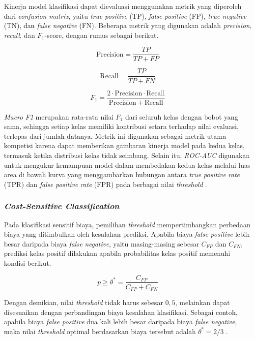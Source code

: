 Kinerja model klasifikasi dapat dievaluasi menggunakan metrik yang diperoleh dari \textit{confusion matrix}, yaitu \textit{true positive} (TP), \textit{false positive} (FP), \textit{true negative} (TN), dan \textit{false negative} (FN). Beberapa metrik yang digunakan adalah \textit{precision}, \textit{recall}, dan $F_1$-score, dengan rumus sebagai berikut.

\[
\mathrm{Precision}=\frac{TP}{TP+FP}
\]

\[
\mathrm{Recall}=\frac{TP}{TP+FN}
\]

\[
F_1=
\frac{2\cdot\mathrm{Precision}\cdot\mathrm{Recall}}
{\mathrm{Precision}+\mathrm{Recall}}
\]

\textit{Macro F1} merupakan rata-rata nilai $F_1$ dari seluruh kelas dengan bobot yang sama, sehingga setiap kelas memiliki kontribusi setara terhadap nilai evaluasi, terlepas dari jumlah datanya. Metrik ini digunakan sebagai metrik utama kompetisi karena dapat memberikan gambaran kinerja model pada kedua kelas, termasuk ketika distribusi kelas tidak seimbang. Selain itu, \textit{ROC-AUC} digunakan untuk mengukur kemampuan model dalam membedakan kedua kelas melalui luas area di bawah kurva yang menggambarkan hubungan antara \textit{true positive rate} (TPR) dan \textit{false positive rate} (FPR) pada berbagai nilai \textit{threshold} \cite{ref:materi-13}.

\subsubsection{\textit{Cost-Sensitive Classification}}
Pada klasifikasi sensitif biaya, pemilihan \textit{threshold} mempertimbangkan perbedaan biaya yang ditimbulkan oleh kesalahan prediksi. Apabila biaya \textit{false positive} lebih besar daripada biaya \textit{false negative}, yaitu masing-masing sebesar $C_{FP}$ dan $C_{FN}$, prediksi kelas positif dilakukan apabila probabilitas kelas positif memenuhi kondisi berikut.

\[
p\geq\theta^{*}=
\frac{C_{FP}}{C_{FP}+C_{FN}}
\]

Dengan demikian, nilai \textit{threshold} tidak harus sebesar $0{,}5$, melainkan dapat disesuaikan dengan perbandingan biaya kesalahan klasifikasi. Sebagai contoh, apabila biaya \textit{false positive} dua kali lebih besar daripada biaya \textit{false negative}, maka nilai \textit{threshold} optimal berdasarkan biaya tersebut adalah $\theta^{*}=2/3$ \cite{ref:elkan-2001}.
